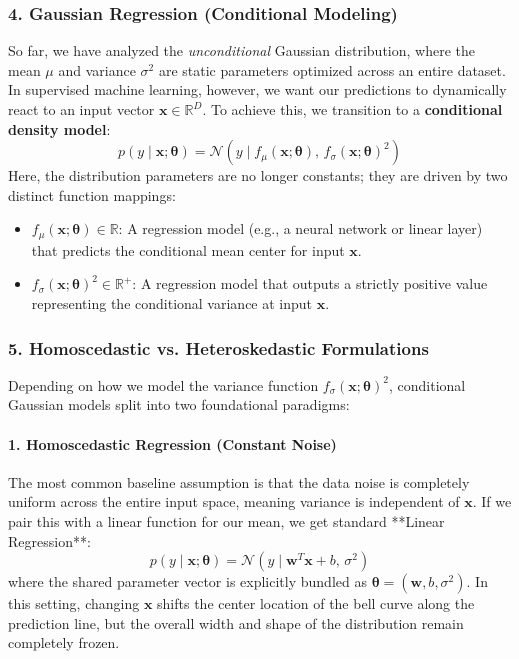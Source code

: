 \documentclass{article}
\begin{document}
\subsubsection*{4. Gaussian Regression (Conditional Modeling)}
So far, we have analyzed the \textit{unconditional} Gaussian distribution, where the mean $\mu$ and variance $\sigma^2$ are static parameters optimized across an entire dataset. In supervised machine learning, however, we want our predictions to dynamically react to an input vector $\mathbf{x} \in \mathbb{R}^D$. To achieve this, we transition to a \textbf{conditional density model}:
\begin{equation}
    p(y \mid \mathbf{x}; \boldsymbol{\theta}) = \mathcal{N}\left(y \mid f_\mu(\mathbf{x}; \boldsymbol{\theta}), \, f_\sigma(\mathbf{x}; \boldsymbol{\theta})^2\right)
\end{equation}
Here, the distribution parameters are no longer constants; they are driven by two distinct function mappings:
\begin{itemize}
    \item $f_\mu(\mathbf{x}; \boldsymbol{\theta}) \in \mathbb{R}$: A regression model (e.g., a neural network or linear layer) that predicts the conditional mean center for input $\mathbf{x}$.
    \item $f_\sigma(\mathbf{x}; \boldsymbol{\theta})^2 \in \mathbb{R}^+$: A regression model that outputs a strictly positive value representing the conditional variance at input $\mathbf{x}$.
\end{itemize}

\subsubsection*{5. Homoscedastic vs. Heteroskedastic Formulations}

Depending on how we model the variance function $f_\sigma(\mathbf{x}; \boldsymbol{\theta})^2$, conditional Gaussian models split into two foundational paradigms:

\paragraph{1. Homoscedastic Regression (Constant Noise)}
The most common baseline assumption is that the data noise is completely uniform across the entire input space, meaning variance is independent of $\mathbf{x}$. If we pair this with a linear function for our mean, we get standard **Linear Regression**:
\begin{equation}
    p(y \mid \mathbf{x}; \boldsymbol{\theta}) = \mathcal{N}\left(y \mid \mathbf{w}^T\mathbf{x} + b, \, \sigma^2\right)
\end{equation}
where the shared parameter vector is explicitly bundled as $\boldsymbol{\theta} = (\mathbf{w}, b, \sigma^2)$. In this setting, changing $\mathbf{x}$ shifts the center location of the bell curve along the prediction line, but the overall width and shape of the distribution remain completely frozen.
\end{document}
